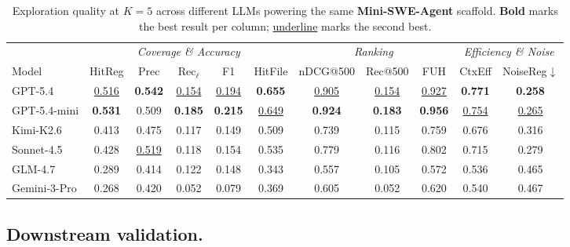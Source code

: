 \documentclass{llmxive}
\providecommand{\arraystretch}{1.18}
\begin{document}
%
\begin{table}[t]
  \centering
  \vspace{1mm}
  \scriptsize
  \renewcommand{\arraystretch}{1.15}
  \begin{tabular*}{\textwidth}{@{\extracolsep{\fill}} l cccc c ccc cc @{}}
    \toprule
    & \multicolumn{5}{c}{\textit{Coverage \& Accuracy}} & \multicolumn{3}{c}{\textit{Ranking}} & \multicolumn{2}{c}{\textit{Efficiency \& Noise}} \\
    \cmidrule(lr){2-6} \cmidrule(lr){7-9} \cmidrule(lr){10-11}
    Model
      & HitReg & Prec & Rec$_\ell$ & F1 & HitFile
      & nDCG@500 & Rec@500 & FUH
      & CtxEff & NoiseReg$\downarrow$ \\
    \midrule
    GPT-5.4
      & \underline{0.516} & \textbf{0.542} & \underline{0.154} & \underline{0.194} & \textbf{0.655}
      & \underline{0.905} & \underline{0.154} & \underline{0.927}
      & \textbf{0.771} & \textbf{0.258} \\
    GPT-5.4-mini
      & \textbf{0.531} & 0.509 & \textbf{0.185} & \textbf{0.215} & \underline{0.649}
      & \textbf{0.924} & \textbf{0.183} & \textbf{0.956}
      & \underline{0.754} & \underline{0.265} \\
    Kimi-K2.6
      & 0.413 & 0.475 & 0.117 & 0.149 & 0.509
      & 0.739 & 0.115 & 0.759
      & 0.676 & 0.316 \\
    Sonnet-4.5
      & 0.428 & \underline{0.519} & {0.118} & 0.154 & 0.535
      & 0.779 & 0.116 & 0.802
      & 0.715 & 0.279 \\
    GLM-4.7
      & 0.289 & 0.414 & 0.122 & 0.148 & 0.343 & 0.557 & 0.105 & 0.572 & 0.536 & 0.465 \\
    Gemini-3-Pro
      & 0.268 & 0.420 & 0.052 & 0.079 & 0.369 & 0.605 & 0.052 & 0.620 & 0.540 & 0.467 \\
    \bottomrule
  \end{tabular*}
  \vspace{-4mm}
\caption{Exploration quality at $K{=}5$ across different LLMs powering the same \textbf{Mini-SWE-Agent} scaffold. \textbf{Bold} marks the best result per column; \underline{underline} marks the second best.}
\label{tab:llm-comparison}
\end{table}




 
\subsection{Downstream validation.}
\label{sec:downstream}
 
\end{document}
